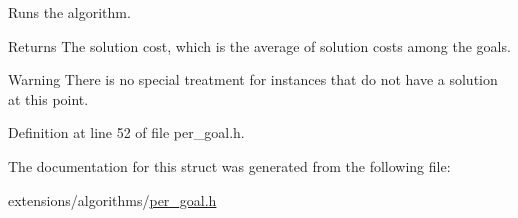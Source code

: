 Runs the algorithm. 

\begin{DoxyReturn}{Returns}
The solution cost, which is the average of solution costs among the goals. 
\end{DoxyReturn}
\begin{DoxyWarning}{Warning}
There is no special treatment for instances that do not have a solution at this point. 
\end{DoxyWarning}


Definition at line 52 of file per\+\_\+goal.\+h.



The documentation for this struct was generated from the following file\+:\begin{DoxyCompactItemize}
\item 
extensions/algorithms/\hyperlink{per__goal_8h}{per\+\_\+goal.\+h}\end{DoxyCompactItemize}
